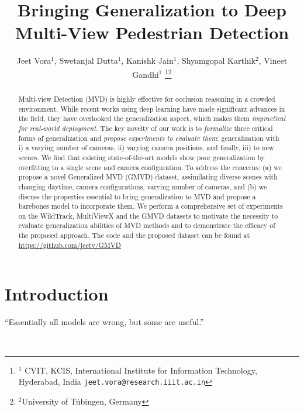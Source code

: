 \documentclass[letterpaper, 10 pt, conference]{ieeeconf}  \usepackage{times}
\title{\LARGE \bf
Bringing Generalization to Deep Multi-View Pedestrian Detection
}
\author{Jeet Vora$^{1}$, Swetanjal Dutta$^{1}$, Kanishk Jain$^{1}$, Shyamgopal Karthik$^{2}$, Vineet Gandhi$^{1}$ \thanks{$^{1}$ CVIT, KCIS, International Institute for Information Technology, Hyderabad, India
        {\tt\footnotesize jeet.vora@research.iiit.ac.in}}\thanks{$^{2}$University of T{\.u}bingen, Germany}}
\begin{document}
\maketitle
\thispagestyle{empty}
\pagestyle{empty}


\begin{abstract}



Multi-view Detection (MVD) is highly effective for occlusion reasoning in a crowded environment. While recent works using deep learning have made significant advances in the field, they have overlooked the generalization aspect, which makes them \emph{impractical for real-world deployment}. The key novelty of our work is to \emph{formalize} three critical forms of generalization and \emph{propose experiments to evaluate them}:  generalization with i) a varying number of cameras, ii) varying camera positions, and finally, iii) to new scenes. We find that existing state-of-the-art models show poor generalization by overfitting to a single scene and camera configuration. To address the concerns: (a) we propose a novel Generalized MVD (GMVD) dataset, assimilating diverse scenes with changing daytime, camera configurations, varying number of cameras, and (b) we discuss the properties essential to bring generalization to MVD and propose a barebones model to incorporate them. We perform a comprehensive set of experiments on the WildTrack, MultiViewX and the GMVD datasets to motivate the necessity to evaluate generalization abilities of MVD methods and to demonstrate the efficacy of the proposed approach. The code and the proposed dataset can be found at \url{https://github.com/jeetv/GMVD}



\end{abstract}


\section{Introduction}

\begin{minipage}{0.45\textwidth}
``Essentially all models are wrong, but some are useful.''
\end{minipage}
\\[3pt]
\end{document}
